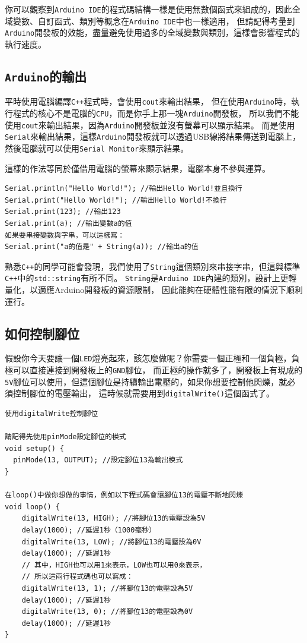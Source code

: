 \documentclass[12pt,a4paper]{article}
\begin{document}
你可以觀察到\texttt{Arduino IDE}的程式碼結構一樣是使用無數個函式來組成的，因此全域變數、自訂函式、類別等概念在\texttt{Arduino IDE}中也一樣適用，
但請記得考量到\texttt{Arduino}開發板的效能，盡量避免使用過多的全域變數與類別，這樣會影響程式的執行速度。

\subsection{\texttt{Arduino}的輸出}
平時使用電腦編譯\texttt{C++}程式時，會使用\texttt{cout}來輸出結果，
但在使用\texttt{Arduino}時，執行程式的核心不是電腦的\texttt{CPU}，而是你手上那一塊\texttt{Arduino}開發板，
所以我們不能使用\texttt{cout}來輸出結果，因為\texttt{Arduino}開發板並沒有螢幕可以顯示結果。
而是使用\texttt{Serial}來輸出結果，這樣\texttt{Arduino}開發板就可以透過USB線將結果傳送到電腦上，
然後電腦就可以使用\texttt{Serial Monitor}來顯示結果。

這樣的作法等同於僅借用電腦的螢幕來顯示結果，電腦本身不參與運算。

\begin{lstlisting}
Serial.println("Hello World!"); //輸出Hello World!並且換行
Serial.print("Hello World!"); //輸出Hello World!不換行
Serial.print(123); //輸出123
Serial.print(a); //輸出變數a的值
如果要串接變數與字串，可以這樣寫：
Serial.print("a的值是" + String(a)); //輸出a的值
\end{lstlisting}

熟悉\texttt{C++}的同學可能會發現，我們使用了\texttt{String}這個類別來串接字串，但這與標準\texttt{C++}中的\texttt{std::string}有所不同。
\texttt{String}是\texttt{Arduino IDE}內建的類別，設計上更輕量化，以適應Arduino開發板的資源限制，
因此能夠在硬體性能有限的情況下順利運行。

\subsection{如何控制腳位}
假設你今天要讓一個\texttt{LED}燈亮起來，該怎麼做呢？你需要一個正極和一個負極，負極可以直接連接到開發板上的\texttt{GND}腳位，
而正極的操作就多了，開發板上有現成的\texttt{5V}腳位可以使用，但這個腳位是持續輸出電壓的，如果你想要控制他閃爍，就必須控制腳位的電壓輸出，
這時候就需要用到\texttt{digitalWrite()}這個函式了。
\begin{lstlisting}    
使用digitalWrite控制腳位

請記得先使用pinMode設定腳位的模式
void setup() {
  pinMode(13, OUTPUT); //設定腳位13為輸出模式
}

在loop()中做你想做的事情，例如以下程式碼會讓腳位13的電壓不斷地閃爍
void loop() {
    digitalWrite(13, HIGH); //將腳位13的電壓設為5V
    delay(1000); //延遲1秒（1000毫秒）
    digitalWrite(13, LOW); //將腳位13的電壓設為0V 
    delay(1000); //延遲1秒
    // 其中，HIGH也可以用1來表示，LOW也可以用0來表示，
    // 所以這兩行程式碼也可以寫成：
    digitalWrite(13, 1); //將腳位13的電壓設為5V
    delay(1000); //延遲1秒
    digitalWrite(13, 0); //將腳位13的電壓設為0V    
    delay(1000); //延遲1秒
}
\end{lstlisting}
\end{document}
